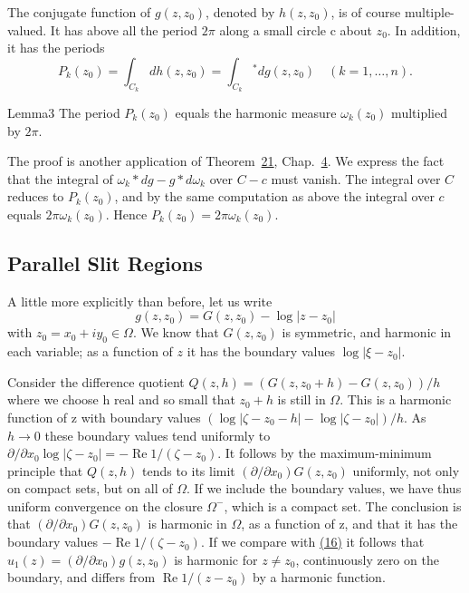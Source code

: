 The conjugate function of $g(z,z_{0})$, denoted by $h(z,z_{0})$, is of course multiple-valued. It has above all the period $2\pi$ along a small circle c about $z_{0}$. In addition, it has the periods
\begin{equation*}
P _ {k} (z _ {0}) = \int_ {C _ {k}} d h (z, z _ {0}) = \int_ {C _ {k}} {}^{*}d g (z, z _ {0}) \quad (k = 1, \dots , n).
\end{equation*}
\begin{originalstatement}{Lemma}{3}\label{lem:6.3}
The period $P_{k}(z_{0})$ equals the harmonic measure $\omega_{k}(z_{0})$ multiplied by $2\pi$.
\end{originalstatement}
The proof is another application of Theorem~\hyperref[thm:4.21]{21}, Chap.~\hyperref[chap:4]{4}. We express the fact that the integral of $\omega_{k} * dg - g * d\omega_{k}$ over $C - c$ must vanish. The integral over $C$ reduces to $P_{k}(z_{0})$, and by the same computation as above the integral over $c$ equals $2\pi \omega_{k}(z_{0})$. Hence $P_{k}(z_{0}) = 2\pi \omega_{k}(z_{0})$.

\setcounter{section}{5}\setcounter{subsection}{2}\subsection{Parallel Slit Regions}\label{sec:6.5.3}
A little more explicitly than before, let us write
\begin{equation*}
g (z, z _ {0}) = G (z, z _ {0}) - \log | z - z _ {0} |\tag{16}\label{eq:6.16}
\end{equation*}
with $z_0 = x_0 + iy_0 \in \Omega$. We know that $G(z, z_0)$ is symmetric, and harmonic in each variable; as a function of $z$ it has the boundary values $\log |\xi - z_0|$.

Consider the difference quotient $Q(z,h) = (G(z,z_{0} + h) - G(z,z_{0}))/h$ where we choose h real and so small that $z_{0} + h$ is still in $\Omega$. This is a harmonic function of z with boundary values $(\log |\zeta - z_{0} - h| - \log |\zeta - z_{0}|)/h$. As $h \to 0$ these boundary values tend uniformly to $\partial/\partial x_{0} \log |\zeta - z_{0}| = -\operatorname{Re} 1/(\zeta - z_{0})$. It follows by the maximum-minimum principle that $Q(z,h)$ tends to its limit $(\partial/\partial x_{0})G(z,z_{0})$ uniformly, not only on compact sets, but on all of $\Omega$. If we include the boundary values, we have thus uniform convergence on the closure $\Omega^{-}$, which is a compact set. The conclusion is that $(\partial/\partial x_{0})G(z,z_{0})$ is harmonic in $\Omega$, as a function of z, and that it has the boundary values $-\operatorname{Re} 1/(\zeta - z_{0})$. If we compare with \hyperref[eq:6.16]{(16)} it follows that $u_{1}(z) = (\partial/\partial x_{0})g(z,z_{0})$ is harmonic for $z \neq z_{0}$, continuously zero on the boundary, and differs from $\operatorname{Re} 1/(z - z_{0})$ by a harmonic function.

